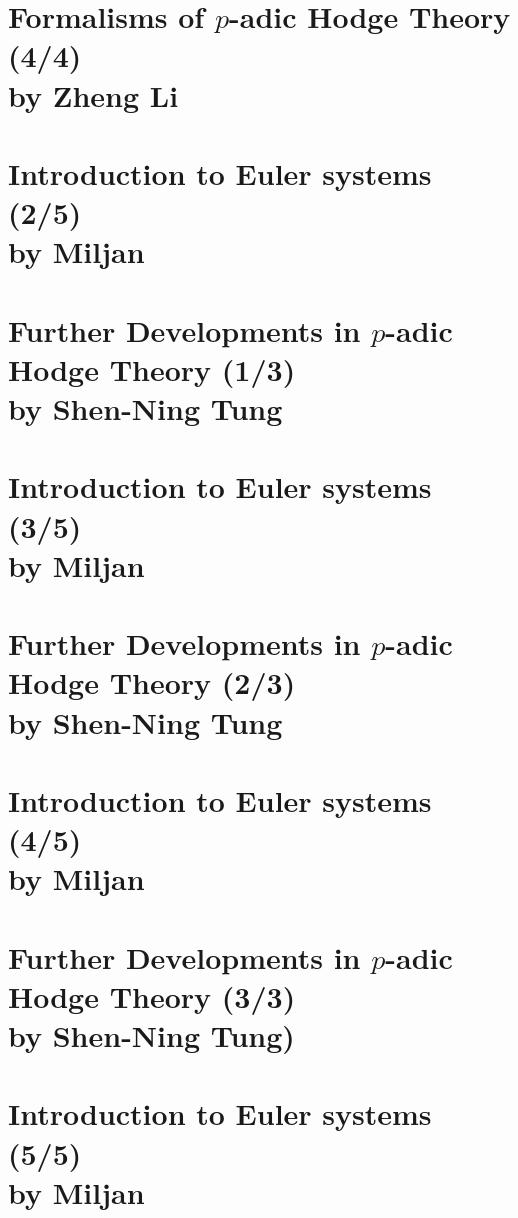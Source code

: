 \documentclass[12pt,amsfont]{amsart}
\begin{document}
\newpage
\section{Formalisms of $p$-adic Hodge Theory
 (4/4)\\ by Zheng Li}\label{18}

\newpage
\section{Introduction to Euler systems (2/5)
\\ by Miljan}\label{19}

\newpage
\section{Further Developments in $p$-adic Hodge Theory (1/3)\\ by Shen-Ning Tung}\label{20}

\newpage
\section{Introduction to Euler systems (3/5)
\\ by Miljan}\label{21}

\newpage
\section{Further Developments in $p$-adic Hodge Theory (2/3)\\ by Shen-Ning Tung}\label{22}

\newpage
\section{Introduction to Euler systems (4/5)
\\ by Miljan}\label{23}

\newpage
\section{Further Developments in $p$-adic Hodge Theory (3/3)\\ by Shen-Ning Tung)}\label{24}

\newpage
\section{Introduction to Euler systems (5/5)
\\ by Miljan}\label{25}
\end{document}
